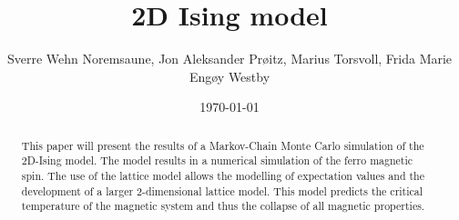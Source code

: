 \documentclass[english,notitlepage,reprint,nofootinbib]{revtex4-1}  %
\begin{document}
\title{2D Ising model}  %
\author{Sverre Wehn Noremsaune, Jon Aleksander Prøitz, Marius Torsvoll, Frida Marie Engøy Westby} %
\date{\today}                             %
\noaffiliation                            %

\begin{abstract}
    This paper will present the results of a Markov-Chain Monte Carlo simulation of the 2D-Ising model. The model results in a numerical
    simulation of the ferro magnetic spin. The use of the lattice model allows the modelling of expectation values and the development
    of a larger 2-dimensional lattice model. This model predicts the critical temperature of the magnetic system and thus
    the collapse of all magnetic properties.
\end{abstract}
\maketitle


\end{document}
